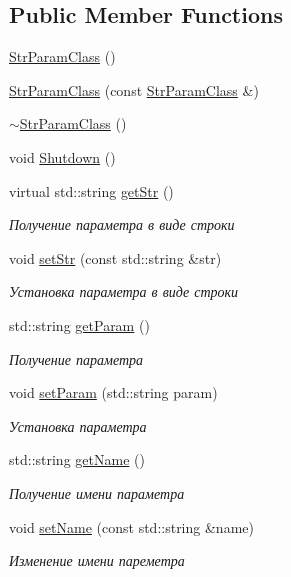 \subsection*{Public Member Functions}
\begin{DoxyCompactItemize}
\item 
\hyperlink{class_str_param_class_a2c16d67151ee547c239cd6eaf6b05d9f}{Str\+Param\+Class} ()
\item 
\hyperlink{class_str_param_class_a79c55976b15214ab4c18f1b7afd27c5d}{Str\+Param\+Class} (const \hyperlink{class_str_param_class}{Str\+Param\+Class} \&)
\item 
\hyperlink{class_str_param_class_ae65f208de0a65b5bca02e2a381ea8a53}{$\sim$\+Str\+Param\+Class} ()
\item 
void \hyperlink{class_str_param_class_ae84185574803c2877e3b1b21a70fa6ac}{Shutdown} ()
\item 
virtual std\+::string \hyperlink{class_str_param_class_a8a10ac8f8780d0d66099ba24245487ea}{get\+Str} ()
\begin{DoxyCompactList}\small\item\em Получение параметра в виде строки \end{DoxyCompactList}\item 
void \hyperlink{class_str_param_class_a4978b404ff3ebc96a13be228a86a8129}{set\+Str} (const std\+::string \&str)
\begin{DoxyCompactList}\small\item\em Установка параметра в виде строки \end{DoxyCompactList}\item 
std\+::string \hyperlink{class_str_param_class_a2c6bbb474c373d1ed4a833de4b1c7e64}{get\+Param} ()
\begin{DoxyCompactList}\small\item\em Получение параметра \end{DoxyCompactList}\item 
void \hyperlink{class_str_param_class_aaaa268386a5159ba1c26532b71f1e326}{set\+Param} (std\+::string param)
\begin{DoxyCompactList}\small\item\em Установка параметра \end{DoxyCompactList}\item 
std\+::string \hyperlink{class_set_param_class_a6c14fce9f4a896f6470888f3cacfb025}{get\+Name} ()
\begin{DoxyCompactList}\small\item\em Получение имени параметра \end{DoxyCompactList}\item 
void \hyperlink{class_set_param_class_aeabf85ad5a078ab4abb8f09a67f2c8e0}{set\+Name} (const std\+::string \&name)
\begin{DoxyCompactList}\small\item\em Изменение имени пареметра \end{DoxyCompactList}\end{DoxyCompactItemize}
